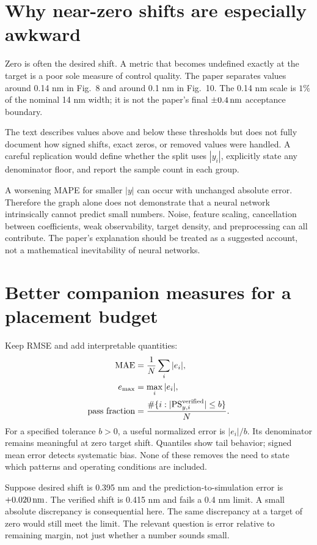 \section{Why near-zero shifts are especially awkward}
Zero is often the desired shift. A metric that becomes undefined exactly
at the target is a poor sole measure of control quality.
The paper separates values around 0.14 nm in Fig.~8 and around 0.1 nm
in Fig.~10. The 0.14 nm scale is $1\%$ of the nominal 14 nm width;
it is not the paper's final $\pm0.4\,\mathrm{nm}$ acceptance boundary.

The text describes values above and below these thresholds but does not
fully document how signed shifts, exact zeros, or removed values were
handled. A careful replication would define whether the split uses
$|y_i|$, explicitly state any denominator floor, and report the sample
count in each group.

A worsening MAPE for smaller $|y|$ can occur with unchanged absolute
error. Therefore the graph alone does not demonstrate that a neural
network intrinsically cannot predict small numbers.
Noise, feature scaling, cancellation between coefficients, weak
observability, target density, and preprocessing can all contribute.
The paper's explanation should be treated as a suggested account,
not a mathematical inevitability of neural networks.

\section{Better companion measures for a placement budget}
Keep RMSE and add interpretable quantities:
\begin{align}
\mathrm{MAE}&=\frac1N\sum_i|e_i|,\\
e_{\max}&=\max_i|e_i|,\\
\mathrm{pass\ fraction}&=
\frac{\#\{i:|\mathrm{PS}_{y,i}^{\rm verified}|\leq b\}}{N}.
\end{align}
For a specified tolerance $b>0$, a useful normalized error is
$|e_i|/b$. Its denominator remains meaningful at zero target shift.
Quantiles show tail behavior; signed mean error detects systematic bias.
None of these removes the need to state which patterns and operating
conditions are included.

Suppose desired shift is 0.395 nm and the prediction-to-simulation
error is $+0.020\,\mathrm{nm}$. The verified shift is 0.415 nm and fails a
0.4 nm limit. A small absolute discrepancy is consequential here.
The same discrepancy at a target of zero would still meet the limit.
The relevant question is error relative to remaining margin, not just
whether a number sounds small.

